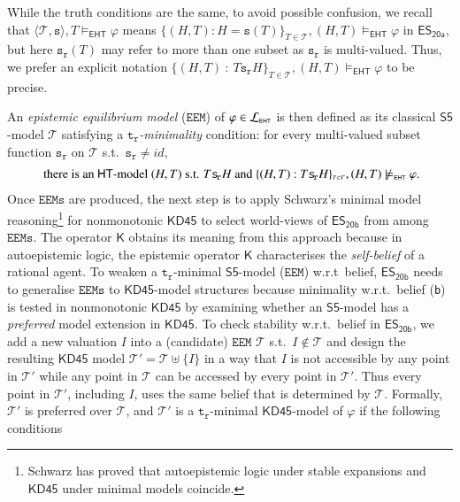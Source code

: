 \documentclass[submission,copyright,creativecommons]{eptcs}
\renewcommand{\phi}  { \varphi }
\newcommand{\lang}[1]  { {\cal L}_{#1} }
\newcommand{\tuple}[1]  { \langle #1 \rangle }
\newcommand{\suchthat}  { \ : \ }
\newcommand{\set}[1]  { \{ #1 \} }
\newcommand{\logic}[1]  { \ensuremath{\mathsf{#1}} }
\newcommand{\sfive}  { \logic{S5} }
\newcommand{\KD}  { \logic{KD45} }
\newcommand{\HT}  { \logic{HT} }
\newcommand{\EHT}  { \logic{EHT} }
\newcommand{\K}  { \mathsf{K} }
\newcommand{\ESyirmia}  { \logic{ES_{\scriptscriptstyle{20a}} } }
\newcommand{\ESyirmib}  { \logic{ES_{\scriptscriptstyle{20b}} } }
\newcommand{\there}  { \mathcal{T} }
\newcommand{\weak}  { \texttt{s} }
\newcommand{\relational}  { \texttt{r} }
\newcommand{\weakrelational}  { \weak_{\!\relational} }
\newcommand{\trelational}  { \texttt{t}_{\!\relational} }
\newcommand{\EEM} { \texttt{EEM} }
\newcommand{\EEMs}  { \texttt{EEMs} }
\newcommand{\Ehtmodels}  { \models_{\scriptscriptstyle \EHT} }
\newcommand{\notEhtmodels}  { \not\models_{\scriptscriptstyle \EHT} }
\begin{document}
While the truth conditions are the same, to avoid possible confusion, 
we recall that $\tuple{\there, \weak}, T \Ehtmodels \phi$ means 
$\set{(H,T) : H =\weak(T)}_{\scriptscriptstyle{T \in \mathcal T}},(H,T) \Ehtmodels \phi$ 
in $\ESyirmia$, 
but here $\weakrelational(T)$ may refer to more than 
one subset as $\weakrelational$ is multi-valued.
Thus, we prefer an explicit notation
$\set{(H,T) {\suchthat} T \weakrelational H}_{\scriptscriptstyle{T \in \mathcal T}}, (H,T) \Ehtmodels \phi$ to be precise.

An \emph{epistemic equilibrium model} ($\EEM$) of  $\phi \in \lang{\scriptscriptstyle{\EHT}}$ 
is then defined as its classical $\sfive$-model $\mathcal T$ satisfying a 
\emph{$\trelational$-minimality} condition: for every multi-valued subset function 
$\weakrelational$ on $\mathcal T$ s.t.\ $\weakrelational \neq id$,
%
\begin{align} \label{t-minimality 2}
\text{ there is an $\HT$-model } (H,T) \text{ s.t. } T \weakrelational H
\text{ and } 
\set{(H,T) {\suchthat} T \weakrelational H}_{\scriptscriptstyle{T \in \mathcal T}}, (H,T) 
\notEhtmodels \phi.
\end{align}
%
Once $\EEMs$ are produced, the next step is to apply Schwarz's \cite{Schwarz92} 
minimal model reasoning\footnote{Schwarz has proved that autoepistemic logic under stable expansions and $\KD$ under minimal models coincide.} for nonmonotonic $\KD$ to select world-views of $\ESyirmib$ from among $\EEMs$. The operator $\K$ obtains 
its meaning from this approach
because in autoepistemic logic, the epistemic operator $\K$ characterises the \emph{self-belief} of a rational agent. To weaken a $\trelational$-minimal $\sfive$-model ($\EEM$) w.r.t\ belief,
$\ESyirmib$ needs to generalise 
$\EEMs$ to $\KD$-model structures because minimality w.r.t.\ belief ({\texttt{b}}) is tested in nonmonotonic $\KD$ by examining whether an $\sfive$-model
has a \emph{preferred} model extension in $\KD$. To check stability w.r.t.\ belief in $\ESyirmib$,
we add a new valuation $I$ into a (candidate) 
$\EEM$ $\mathcal T$ s.t.\ $I \not\in \mathcal T$ 
and design the resulting $\KD$ model $\mathcal T' = \mathcal T \uplus \set I$ in a way that $I$ is not accessible by any point in $\mathcal T'$ while any point in $\mathcal T$ can be accessed by every point in $\mathcal T'$.
Thus every point in $\mathcal T'$, including $I$, 
uses the same belief that is determined by $\mathcal T$. Formally,
$\mathcal T'$ is preferred over $\mathcal T$, and  $\mathcal T'$ is a $\trelational$-minimal $\KD$-model of $\phi$ if the following conditions
\end{document}
